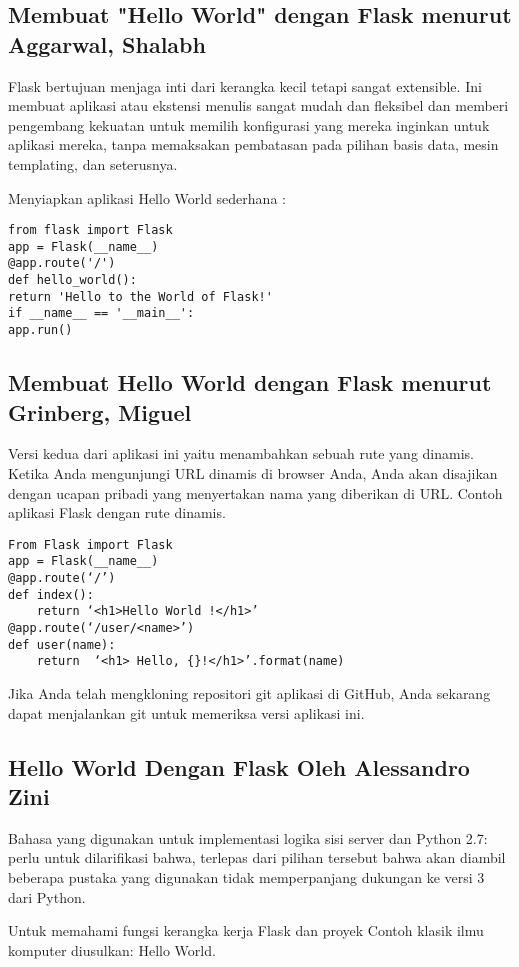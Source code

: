 \documentclass[12pt]{article}
\begin{document}
\subsection{Membuat "Hello World" dengan Flask menurut Aggarwal, Shalabh }
Flask bertujuan menjaga inti dari kerangka kecil tetapi sangat extensible. Ini membuat aplikasi atau ekstensi menulis sangat mudah dan fleksibel dan memberi pengembang kekuatan untuk memilih konfigurasi yang mereka inginkan untuk aplikasi mereka, tanpa memaksakan pembatasan pada pilihan basis data, mesin templating, dan seterusnya\cite{aggarwal2014flask}.

Menyiapkan aplikasi Hello World sederhana :
\begin{verbatim}
from flask import Flask
app = Flask(__name__)
@app.route('/')
def hello_world():
return 'Hello to the World of Flask!'
if __name__ == '__main__':
app.run()
\end{verbatim}

\subsection{Membuat Hello World dengan Flask menurut Grinberg, Miguel}
Versi kedua dari aplikasi ini yaitu menambahkan sebuah rute yang dinamis. Ketika Anda mengunjungi URL dinamis di browser Anda, Anda akan disajikan dengan ucapan pribadi yang menyertakan nama yang diberikan di URL. Contoh aplikasi Flask dengan rute dinamis.
\begin{verbatim}
From Flask import Flask
app = Flask(__name__)
@app.route(‘/’)
def index():
	return ‘<h1>Hello World !</h1>’
@app.route(‘/user/<name>’)
def user(name):
	return  ‘<h1> Hello, {}!</h1>’.format(name)

\end{verbatim}
Jika Anda telah mengkloning repositori git aplikasi di GitHub, Anda sekarang dapat menjalankan git untuk memeriksa versi aplikasi ini\cite{grinberg2018flask}.

\subsection{Hello World Dengan Flask Oleh Alessandro Zini}

Bahasa yang digunakan untuk implementasi logika sisi server dan Python 2.7: perlu untuk dilarifikasi bahwa, terlepas dari pilihan tersebut bahwa akan diambil beberapa pustaka yang digunakan tidak memperpanjang dukungan ke versi 3 dari Python.

Untuk memahami fungsi kerangka kerja Flask dan proyek Contoh klasik ilmu komputer diusulkan: Hello World.
\end{document}
